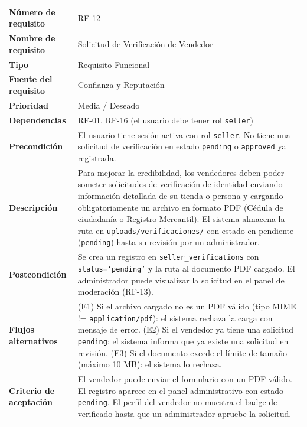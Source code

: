 \documentclass[11pt,a4paper]{report}
\begin{document}
\begin{table}[H]
\centering
\begin{tabularx}{\textwidth}{|l|L|}
\hline
{} \\ \hline
\textbf{Número de requisito} & RF-12 \\ \hline
\textbf{Nombre de requisito} & Solicitud de Verificación de Vendedor \\ \hline
\textbf{Tipo} & Requisito Funcional \\ \hline
\textbf{Fuente del requisito} & Confianza y Reputación \\ \hline
\textbf{Prioridad} & Media / Deseado \\ \hline
\textbf{Dependencias} & RF-01, RF-16 (el usuario debe tener rol \texttt{seller}) \\ \hline
\textbf{Precondición} & El usuario tiene sesión activa con rol \texttt{seller}. No tiene una solicitud de verificación en estado \texttt{pending} o \texttt{approved} ya registrada. \\ \hline
\textbf{Descripción} & Para mejorar la credibilidad, los vendedores deben poder someter solicitudes de verificación de identidad enviando información detallada de su tienda o persona y cargando obligatoriamente un archivo en formato PDF (Cédula de ciudadanía o Registro Mercantil). El sistema almacena la ruta en \texttt{uploads/verificaciones/} con estado en pendiente (\texttt{pending}) hasta su revisión por un administrador. \\ \hline
\textbf{Postcondición} & Se crea un registro en \texttt{seller\_verifications} con \texttt{status='pending'} y la ruta al documento PDF cargado. El administrador puede visualizar la solicitud en el panel de moderación (RF-13). \\ \hline
\textbf{Flujos alternativos} & (E1) Si el archivo cargado no es un PDF válido (tipo MIME != \texttt{application/pdf}): el sistema rechaza la carga con mensaje de error. (E2) Si el vendedor ya tiene una solicitud \texttt{pending}: el sistema informa que ya existe una solicitud en revisión. (E3) Si el documento excede el límite de tamaño (máximo 10 MB): el sistema lo rechaza. \\ \hline
\textbf{Criterio de aceptación} & El vendedor puede enviar el formulario con un PDF válido. El registro aparece en el panel administrativo con estado \texttt{pending}. El perfil del vendedor no muestra el badge de verificado hasta que un administrador apruebe la solicitud. \\ \hline
\end{tabularx}
\end{table}
\end{document}

